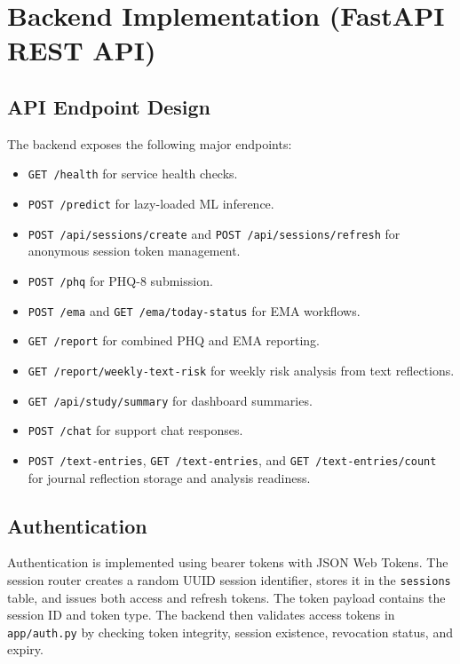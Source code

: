 \section{Backend Implementation (FastAPI REST API)}

\subsection{API Endpoint Design}

The backend exposes the following major endpoints:

\begin{itemize}
  \item \texttt{GET /health} for service health checks.
  \item \texttt{POST /predict} for lazy-loaded ML inference.
  \item \texttt{POST /api/sessions/create} and \texttt{POST /api/sessions/refresh} for anonymous session token management.
  \item \texttt{POST /phq} for PHQ-8 submission.
  \item \texttt{POST /ema} and \texttt{GET /ema/today-status} for EMA workflows.
  \item \texttt{GET /report} for combined PHQ and EMA reporting.
  \item \texttt{GET /report/weekly-text-risk} for weekly risk analysis from text reflections.
  \item \texttt{GET /api/study/summary} for dashboard summaries.
  \item \texttt{POST /chat} for support chat responses.
  \item \texttt{POST /text-entries}, \texttt{GET /text-entries}, and \texttt{GET /text-entries/count} for journal reflection storage and analysis readiness.
\end{itemize}

\subsection{Authentication}

Authentication is implemented using bearer tokens with JSON Web Tokens. The session router creates a random UUID session identifier, stores it in the \texttt{sessions} table, and issues both access and refresh tokens. The token payload contains the session ID and token type. The backend then validates access tokens in \texttt{app/auth.py} by checking token integrity, session existence, revocation status, and expiry.


